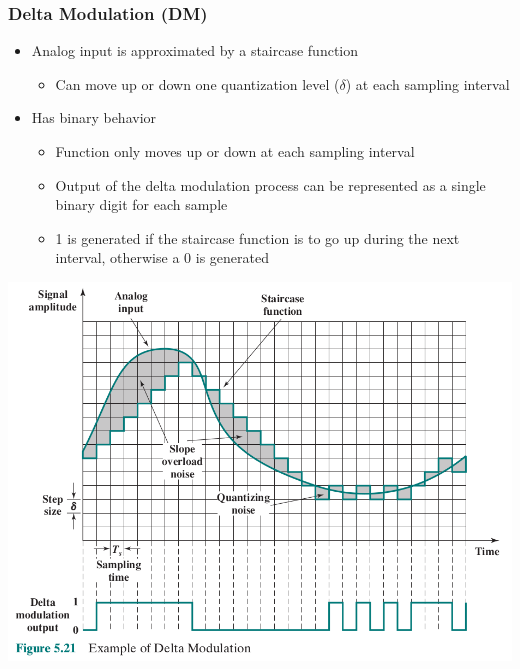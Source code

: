 \documentclass[pdflatex,compress]{beamer}
\begin{document}
\begin{frame}
	\frametitle{Delta Modulation (DM)}
	\begin{itemize}
		\item Analog input is approximated by a staircase function
		\begin{itemize}
			\item Can move up or down one quantization level ($ \delta $) at each sampling interval
		\end{itemize}
		\item Has binary behavior
		\begin{itemize}
			\item Function only moves up or down at each sampling interval
			\item Output of the delta modulation process can be represented as a single binary digit for each sample
			\item 1 is generated if the staircase function is to go up during the next interval, otherwise a 0 is generated
		\end{itemize}
	\end{itemize}
\end{frame}

\begin{frame}
	\begin{center}
		\includegraphics[width=0.9\linewidth]{img/img27}
	\end{center}
\end{frame}
\end{document}
